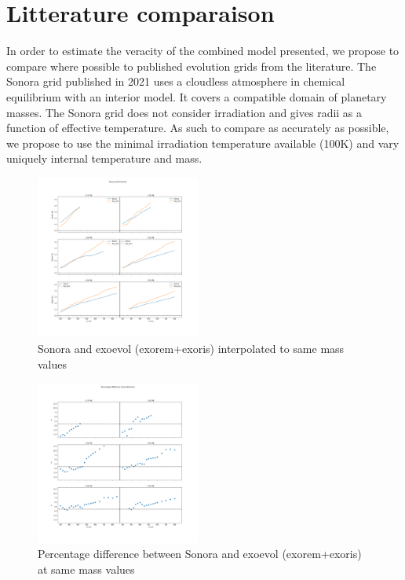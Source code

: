 \section{Litterature comparaison}

In order to estimate the veracity of the combined model presented, we propose to compare where possible to published evolution grids from the literature. The Sonora grid published in 2021\parencite{marley_sonora_2021} uses a cloudless atmosphere in chemical equilibrium with an interior model. It covers a compatible domain of planetary masses. The Sonora grid does not consider irradiation and gives radii as a function of effective temperature. As such to compare as accurately as possible, we propose to use the minimal irradiation temperature available (100K) and vary uniquely internal temperature and mass.\par

\begin{figure}
    \centering
    \includegraphics[width=0.48\textwidth]{Images/comp_sonora.png}
    \caption{Sonora and exoevol (exorem+exoris) interpolated to same mass values}
    \label{fig:Son+Exo}
\end{figure}


\begin{figure}
    \centering
    \includegraphics[width=0.48\textwidth]{Images/perc_diff_sonora.png}
    \caption{Percentage difference between Sonora and exoevol (exorem+exoris) at same mass values}
    \label{fig:Son+Exo_perc}
\end{figure}

